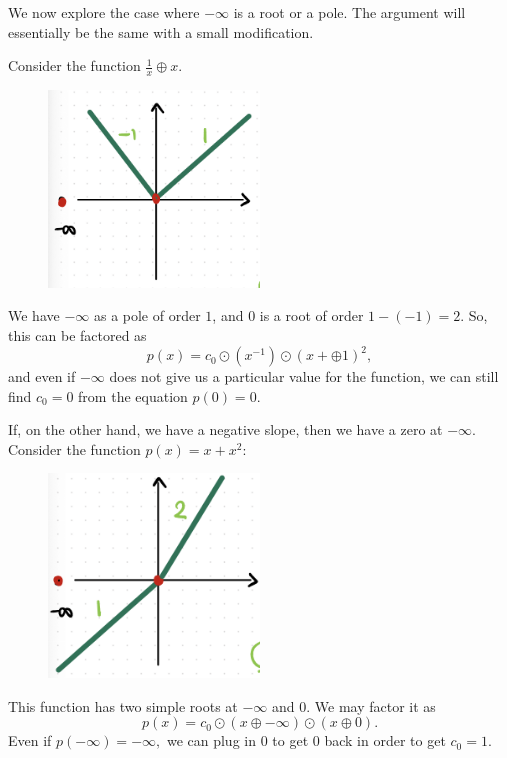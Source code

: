 \documentclass[12pt]{memoir}
\theoremstyle{definition}
\begin{document}
\begin{Ex}
    We now explore the case where $-\infty$ is a root or a pole. The argument will essentially be the same with a small modification.\par 
    Consider the function $\frac{1}{x}\oplus x$.
    \begin{figure}[h!]
        \centering
        \includegraphics[width=0.5\textwidth]{figs/fig4-2RootAndPoleProof.png}
        \label{fig:4.2-RootAndPoleProof}
    \end{figure}
    We have $-\infty$ as a pole of order $1$, and $0$ is a root of order $1-(-1)=2$. So, this can be factored as 
    $$p(x)=c_0\odot(x^{-1})\odot(x+\oplus 1)^2,$$
    and even if $-\infty$ does not give us a particular value for the function, we can still find $c_0=0$ from the equation $p(0)=0$.\par 
    If, on the other hand, we have a negative slope, then we have a zero at $-\infty$. Consider the function $p(x)=x+x^2$:
    \begin{figure}[h!]
        \centering
        \includegraphics[width=0.5\textwidth]{figs/fig4-3RootsForProof.png}
        \label{fig:4.3-RootsForProof}
    \end{figure}

    This function has two simple roots at $-\infty$ and $0$. We may factor it as 
    $$p(x)=c_0\odot(x\oplus-\infty)\odot(x\oplus 0).$$
    Even if $p(-\infty)=-\infty,$ we can plug in $0$ to get $0$ back in order to get $c_0=1$.
\end{Ex}
\end{document}
